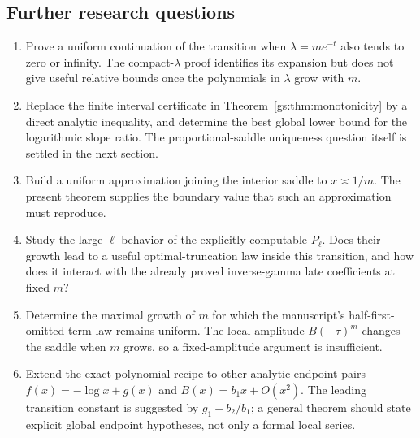 \subsection{Further research questions}

\begin{enumerate}
\item Prove a uniform continuation of the transition when
$\lambda=me^{-t}$ also tends to zero or infinity. The compact-$\lambda$
proof identifies its expansion but does not give useful relative
bounds once the polynomials in $\lambda$ grow with $m$.
\item Replace the finite interval certificate in
Theorem~\ref{gs:thm:monotonicity} by a direct analytic inequality,
and determine the best global lower bound for the logarithmic
slope ratio. The proportional-saddle uniqueness question itself
is settled in the next section.
\item Build a uniform approximation joining the interior saddle to
$x\asymp1/m$. The present theorem supplies the boundary value that
such an approximation must reproduce.
\item Study the large-$\ell$ behavior of the explicitly computable
$P_\ell$. Does their growth lead to a useful optimal-truncation law
inside this transition, and how does it interact with the already
proved inverse-gamma late coefficients at fixed $m$?
\item Determine the maximal growth of $m$ for which the manuscript's
half-first-omitted-term law remains uniform. The local amplitude
$B(-\tau)^m$ changes the saddle when $m$ grows, so a fixed-amplitude
argument is insufficient.
\item Extend the exact polynomial recipe to other analytic endpoint
pairs $f(x)=-\log x+g(x)$ and $B(x)=b_1x+O(x^2)$. The leading
transition constant is suggested by $g_1+b_2/b_1$; a general theorem
should state explicit global endpoint hypotheses, not only a formal
local series.
\end{enumerate}
